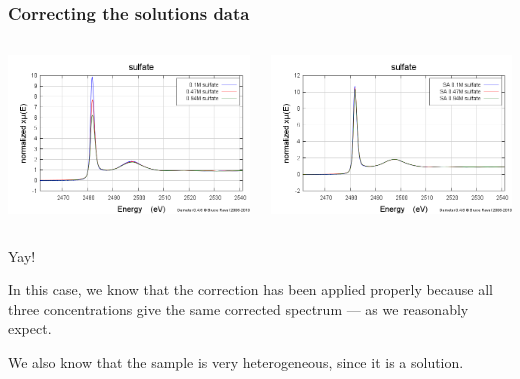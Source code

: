 \documentclass[10pt, xcolor=x11names, compress, handout]{beamer}
\begin{document}
\begin{frame}
  \frametitle{Correcting the solutions data}
  \begin{columns}
    \begin{column}{0.5\linewidth}
      \includegraphics[width=\linewidth]{images/sulfate.png}      
    \end{column}
    \begin{column}{0.5\linewidth}
      \includegraphics[width=\linewidth]{images/sulfate_sa.png}      
    \end{column}
  \end{columns}
  \begin{center}
    Yay!
  \end{center}

  \begin{exampleblock}{}
    In this case, we know that the correction has been applied
    properly because all three concentrations give the same corrected
    spectrum --- as we reasonably expect.

    \medskip

    We also know that the sample is very heterogeneous, since it is a
    solution.
  \end{exampleblock}

\end{frame}
\end{document}
